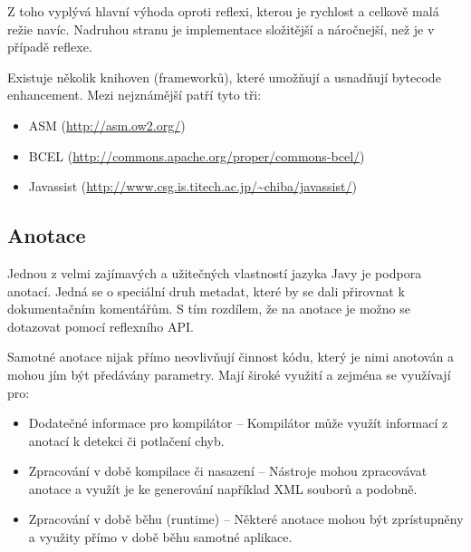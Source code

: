 Z toho vyplývá hlavní výhoda oproti reflexi, kterou je rychlost a celkově malá režie navíc. Nadruhou stranu je implementace složitější a náročnejší, než je v případě reflexe.

Existuje několik knihoven (frameworků), které umožňují a usnadňují bytecode enhancement. Mezi nejznámější patří tyto tři:
\begin{itemize}
  \item ASM (\url{http://asm.ow2.org/})
  \item BCEL (\url{http://commons.apache.org/proper/commons-bcel/})
  \item Javassist (\url{http://www.csg.is.titech.ac.jp/~chiba/javassist/})
\end{itemize}


\subsection{Anotace}
Jednou z velmi zajímavých a užitečných vlastností jazyka Javy je podpora anotací. Jedná se o speciální druh metadat, které by se dali přirovnat k dokumentačním komentářům. S tím rozdílem, že na anotace je možno se dotazovat pomocí reflexního API.

Samotné anotace nijak přímo neovlivňují činnost kódu, který je nimi anotován a mohou jím být předávány parametry. Mají široké využití a zejména se využívají pro:
\begin{itemize}
  \item Dodatečné informace pro kompilátor -- Kompilátor může využít informací z anotací k detekci či potlačení chyb.
  \item Zpracování v době kompilace či nasazení -- Nástroje mohou zpracovávat anotace a využít je ke generování například XML souborů a podobně.
  \item Zpracování v době běhu (runtime) -- Některé anotace mohou být zprístupněny a využity přímo v době běhu samotné aplikace.
\end{itemize}

